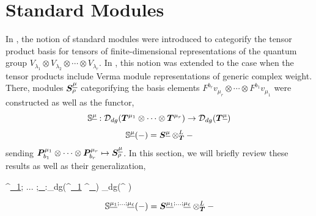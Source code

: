 \documentclass{article}
\begin{document}
\section{Standard Modules}\label{sec:Standards}
In \cite{Web}, the notion of standard modules were introduced to categorify the tensor product basis for tensors of finite-dimensional representations of the quantum group $V_{\lambda_1}\otimes V_{\lambda_2}\otimes \cdots \otimes V_{\lambda_r}$. In \cite{Na}, this notion was extended to the case when the tensor products include Verma module representations of generic complex weight. There, modules ${\boldsymbol{S}}^{\underline{\mu}}_{\rho} $ categorifying the basis elements $F^{b_r}v_{\mu_r}\otimes \cdots \otimes F^{b_1}v_{\mu_1} $ were constructed as well as the functor,
$$\mathbb{S}^{\underline{\mu}}:\mathcal{D}_{dg}({\boldsymbol{T}}^{\mu_1} \otimes \cdots \otimes {\boldsymbol{T}}^{\mu_r}) \rightarrow \mathcal{D}_{dg}({\boldsymbol{T}}^{\underline{\mu}} ) $$
$$\mathbb{S}^{\underline{\mu}} (-) = {\boldsymbol{S}}^{\underline{\mu}}\otimes^L_{{\boldsymbol{T}}}-$$
sending ${\boldsymbol{P}}_{b_1}^{\mu_1} \otimes \cdots \otimes {\boldsymbol{P}}_{b_r}^{\mu_r} \mapsto {\boldsymbol{S}}^{\underline{\mu}}_{\rho}$. In this section, we will briefly review these results as well as their generalization,  


\be \label{eq: standard_functor}^{\underline{\mu_1}; ... ;\underline{\mu_\ell}}:_{dg}(\Tb^{\underline{\mu_1}} \otimes \cdots \otimes \Tb^{\underline{\mu_\ell}}) \rightarrow {}_{dg}(\Tb^{\underline{\mu}} ) \ee 

$$
\mathbb{S}^{\underline{\mu_1}; ... ;\underline{\mu_\ell}} (-) = {\boldsymbol{S}}^{\underline{\mu_1}; ... ;\underline{\mu_\ell}}\otimes^L_{{\boldsymbol{T}}}-$$
\end{document}
